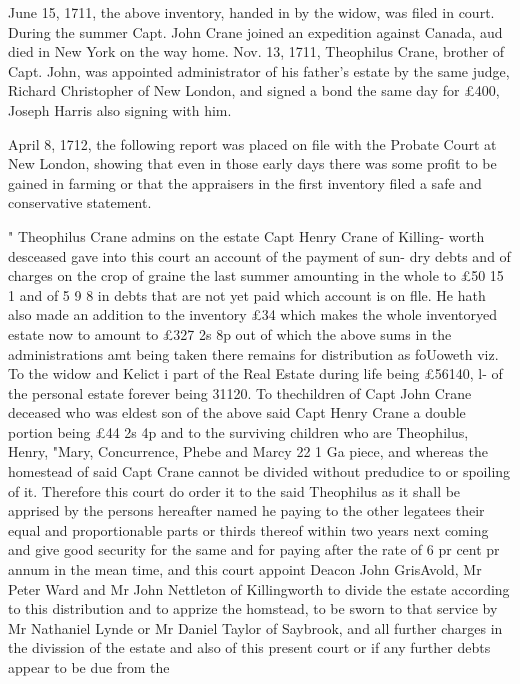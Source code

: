 \documentclass{book}
\begin{document}
June 15, 1711, the above inventory, handed in by the widow, 
was filed in court. During the summer Capt. John Crane joined 
an expedition against Canada, aud died in New York on the way 
home. Nov. 13, 1711, Theophilus Crane, brother of Capt. John, 
was appointed administrator of his father's estate by the same 
judge, Richard Christopher of New London, and signed a bond 
the same day for £400, Joseph Harris also signing with him. 

April 8, 1712, the following report was placed on file with the 
Probate Court at New London, showing that even in those early 
days there was some profit to be gained in farming or that the 
appraisers in the first inventory filed a safe and conservative 
statement. 

" Theophilus Crane admins on the estate Capt Henry Crane of Killing- 
worth desceased gave into this court an account of the payment of sun- 
dry debts and of charges on the crop of graine the last summer amounting 
in the whole to £50  15  1 and of 5  9  8 in debts that are not yet paid 
which account is on flle. He hath also made an addition to the inventory 
£34 which makes the whole inventoryed estate now to amount to £327  
2s  8p out of which the above sums in the administrations amt being 
taken there remains for distribution as foUoweth viz. To the widow and 
Kelict i part of the Real Estate during life being £56140, l- of the 
personal estate forever being 31120. To thechildren of Capt John 
Crane deceased who was eldest son of the above said Capt Henry Crane 
a double portion being £44  2s  4p and to the surviving children who are 
Theophilus, Henry, "Mary, Concurrence, Phebe and Marcy 22  1  Ga 
piece, and whereas the homestead of said Capt Crane cannot be divided 
without predudice to or spoiling of it. Therefore this court do order it 
to the said Theophilus as it shall be apprised by the persons hereafter 
named he paying to the other legatees their equal and proportionable 
parts or thirds thereof within two years next coming and give good 
security for the same and for paying after the rate of 6 pr cent pr 
annum in the mean time, and this court appoint Deacon John GrisAvold, 
Mr Peter Ward and Mr John Nettleton of Killingworth to divide the 
estate according to this distribution and to apprize the homstead, to be 
sworn to that service by Mr Nathaniel Lynde or Mr Daniel Taylor of 
Saybrook, and all further charges in the divission of the estate and also 
of this present court or if any further debts appear to be due from the 
\end{document}
